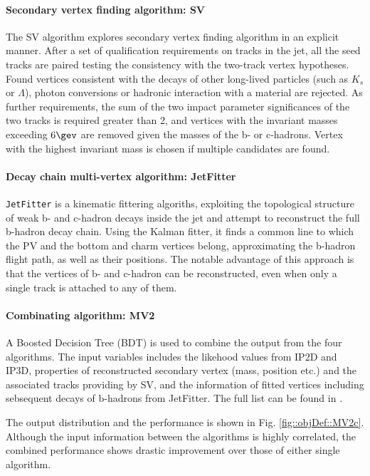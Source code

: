 \paragraph{Secondary vertex finding algorithm: SV}
The SV algorithm \cite{152_SV} explores secondary vertex finding algorithm in an explicit manner. 
After a set of qualification requirements on tracks in the jet, all the seed tracks are paired testing the consistency with the two-track vertex hypotheses. Found vertices consistent with the decays of other long-lived particles (such as $K_s$ or $\Lambda$), photon conversions or hadronic interaction with a material are rejected. As further requirements, the sum of the two impact parameter significances of the two tracks is required greater than 2, and vertices with the invariant masses exceeding $6 \gev$ are removed given the masses of the b- or c-hadrons. 
Vertex with the highest invariant mass is chosen if multiple candidates are found. %


\paragraph{Decay chain multi-vertex algorithm: JetFitter}
\texttt{JetFitter} \cite{153_JetFitter} is a kinematic fittering algoriths, exploiting the topological structure of weak b- and c-hadron decays inside the jet and attempt to reconstruct the full b-hadron decay chain. Using the Kalman fitter, it finds a common line to which the PV and the bottom and charm vertices belong, approximating the b-hadron flight path, as well as their positions. The notable advantage of this approach is that the vertices of b- and c-hadron can be reconstructed, even when only a single track is attached to any of them.

\paragraph{Combinating algorithm: MV2 }
A Boosted Decision Tree (BDT) is used to combine the output from the four algorithms.
The input variables includes
the likehood values from IP2D and IP3D,
properties of reconstructed secondary vertex (mass, position etc.) and the associated tracks providing by SV,
and the information of fitted vertices including sebsequent decays of b-hadrons from JetFitter.
The full list can be found in \cite{150_bTag_Run2_exp}.

The output distribution and the performance is shown in Fig. \ref{fig::objDef::MV2c}.
Although the input information between the algorithms is highly correlated, the combined performance shows drastic improvement over those of either single algorithm.

